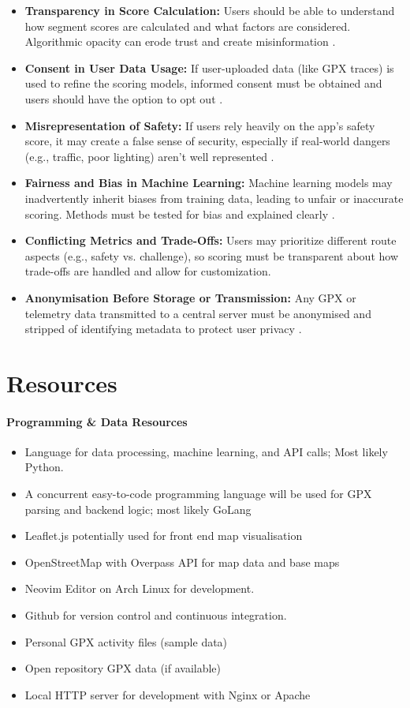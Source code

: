 \documentclass{article}
\begin{document}
\begin{itemize}
	\item \textbf{Transparency in Score Calculation:} Users should be able to understand how segment scores are calculated and what factors are considered. Algorithmic opacity can erode trust and create misinformation \citep{floridi2016data}.
	\item \textbf{Consent in User Data Usage:} If user-uploaded data (like GPX traces) is used to refine the scoring models, informed consent must be obtained and users should have the option to opt out \citep{gdpr}.
	\item \textbf{Misrepresentation of Safety:} If users rely heavily on the app’s safety score, it may create a false sense of security, especially if real-world dangers (e.g., traffic, poor lighting) aren't well represented \citep{tufekci2015algorithmic}.
	\item \textbf{Fairness and Bias in Machine Learning:} Machine learning models may inadvertently inherit biases from training data, leading to unfair or inaccurate scoring. Methods must be tested for bias and explained clearly \citep{danks2017bias}.
	\item \textbf{Conflicting Metrics and Trade-Offs:} Users may prioritize different route aspects (e.g., safety vs. challenge), so scoring must be transparent about how trade-offs are handled and allow for customization.
	\item \textbf{Anonymisation Before Storage or Transmission:} Any GPX or telemetry data transmitted to a central server must be anonymised and stripped of identifying metadata to protect user privacy .
\end{itemize}

\newpage
\section{Resources}
\paragraph{Programming \& Data Resources}
\begin{itemize}
	\item Language for data processing, machine learning, and API calls; Most likely Python. \citep{pythondoc}
	\item A concurrent easy-to-code programming language will be used for GPX parsing and backend logic; most likely GoLang \citep{golangdoc}
	\item Leaflet.js potentially used for front end map visualisation \citep{leafletdoc}
	\item OpenStreetMap with Overpass API for map data and base maps \citep{overpassapi}
	\item Neovim Editor on Arch Linux for development.
	\item Github for version control and continuous integration.
	\item Personal GPX activity files (sample data)
	\item Open repository GPX data (if available)
	\item Local HTTP server for development with Nginx or Apache
\end{itemize}
\end{document}
